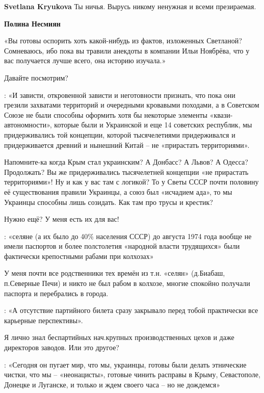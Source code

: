 \begin{itemize}
\begin{itemize}
\textbf{Svetlana Kryukova} Ты ничья. Вырусь никому ненужная и всеми презираемая.

 
\textbf{Полина Несмиян} 

«Вы готовы оспорить хоть какой-нибудь из фактов, изложенных Светланой?
Сомневаюсь, ибо пока вы травили анекдоты в компании Ильи Ноябрёва, что у вас
получается лучше всего, она историю изучала.»

Давайте посмотрим?

: «И зависти, откровенной зависти и неготовности признать, что пока они грезили
захватами территорий и очередными кровавыми походами, а в Советском Союзе не
были способны оформить хотя бы некоторые элементы «квази-автономности», которые
были и Украинской и еще 14 советских республик, мы придерживались той
концепции, которой тысячелетиями придерживался и придерживается древний и
нынешний Китай – не «прирастать территориями».

Напомните-ка когда Крым стал украинским? А Донбасс? А Львов? А Одесса? Продолжать? Вы же придерживались тысячелетней концепции «не прирастать территориями»! Ну и как у вас там с логикой? То у Светы СССР почти половину её существования правили Украинцы, а союз был «исчадием ада», то мы Украинцы способны лишь созидать. Как там про трусы и крестик?

Нужно ещё? У меня есть их для вас!

: «селяне (а их было до 40\% населения СССР) до августа 1974 года вообще не
имели паспортов и более полстолетия «народной власти трудящихся» были
фактически крепостными рабами при колхозах»

У меня почти все родственники тех времён из т.н. «селян» (д.Биабаш, п.Северные
Печи) и никто не был рабом в колхозе, многие спокойно получали паспорта и
перебрались в города.

: «А отсутствие партийного билета сразу закрывало перед тобой практически все карьерные перспективы».

Я лично знал беспартийных нач.крупных производственных цехов и даже директоров заводов. Или это другое?

: «Сегодня он пугает мир, что мы, украинцы, готовы были делать этнические
чистки, что мы – «неонацисты», готовые чинить расправы в Крыму, Севастополе,
Донецке и Луганске, и только и ждем своего часа – но не дождемся»


\end{itemize}
\end{itemize}
